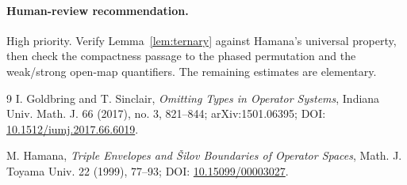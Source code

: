 \documentclass[11pt]{article}
\begin{document}
\paragraph{Human-review recommendation.}
High priority. Verify Lemma~\ref{lem:ternary} against Hamana's universal
property, then check the compactness passage to the phased permutation and the
weak/strong open-map quantifiers. The remaining estimates are elementary.

\begin{thebibliography}{9}
I. Goldbring and T. Sinclair,
\emph{Omitting Types in Operator Systems}, Indiana Univ. Math. J. 66 (2017),
no. 3, 821--844; arXiv:1501.06395;
DOI: \href{https://doi.org/10.1512/iumj.2017.66.6019}{10.1512/iumj.2017.66.6019}.

M. Hamana,
\emph{Triple Envelopes and \v{S}ilov Boundaries of Operator Spaces},
Math. J. Toyama Univ. 22 (1999), 77--93;
DOI: \href{https://doi.org/10.15099/00003027}{10.15099/00003027}.
\end{thebibliography}
\end{document}
